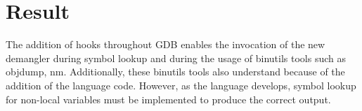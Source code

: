 \section{Result}
The addition of hooks throughout GDB enables the invocation of the new \CFAS
demangler during symbol lookup and during the usage of binutils tools such as
objdump, nm. Additionally, these binutils tools also understand \CFAS because
of the addition of the \CFAS language code. However, as the
language develops, symbol lookup for non-local variables must be implemented to
produce the correct output.
